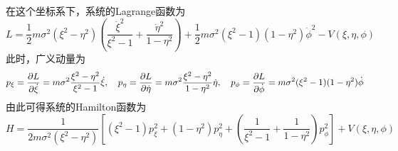 \begin{example}
在这个坐标系下，系统的Lagrange函数为
\begin{equation}
	L = \frac12 m\sigma^2 (\xi^2-\eta^2)\left(\frac{\dot{\xi}^2}{\xi^2-1} + \frac{\dot{\eta}^2}{1-\eta^2}\right) + \frac12 m\sigma^2(\xi^2-1)(1-\eta^2)\dot{\phi}^2 - V(\xi,\eta,\phi)
	\label{chp3:椭圆坐标下的分离变量-1}
\end{equation}
此时，广义动量为
\begin{equation*}
	p_\xi = \frac{\partial L}{\partial \dot{\xi}} = m\sigma^2 \frac{\xi^2-\eta^2}{\xi^2-1} \dot{\xi},\quad p_\eta = \frac{\partial L}{\partial \dot{\eta}} = m\sigma^2 \frac{\xi^2-\eta^2}{1-\eta^2} \dot{\eta},\quad p_\phi = \frac{\partial L}{\partial \dot{\phi}} = m\sigma^2(\xi^2-1)(1-\eta^2)\dot{\phi}
\end{equation*}
由此可得系统的Hamilton函数为
\begin{equation}
	H = \frac{1}{2m\sigma^2(\xi^2-\eta^2)}\left[(\xi^2-1)p_\xi^2+(1-\eta^2)p_\eta^2+\left(\frac{1}{\xi^2-1}+\frac{1}{1-\eta^2}\right)p_\phi^2\right] + V(\xi,\eta,\phi)
	\label{chp3:椭圆坐标下的分离变量-2}
\end{equation}


\end{example}
